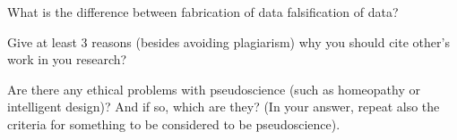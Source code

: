 \documentclass[a4paper,twoside=false,abstract=false,numbers=noenddot,
titlepage=false,headings=small,parskip=half,version=last]{scrartcl}
\begin{document}

\begin{exercise}{1}
    What is the difference between fabrication of data falsification of data?
\end{exercise}
\begin{solution}
\end{solution}
\begin{exercise}{2}
    Give at least 3 reasons (besides avoiding plagiarism) why you should cite
    other's work in you research?
\end{exercise}
\begin{solution}

\end{solution}
\begin{exercise}{3}
    Are there any ethical problems with pseudoscience (such as homeopathy or
    intelligent design)? And if so, which are they? (In your answer, repeat
    also the criteria for something to be considered to be pseudoscience).
\end{exercise}
\begin{solution}

\end{solution}
\end{document}
